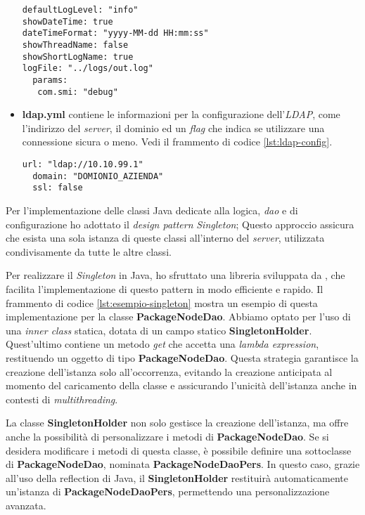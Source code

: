 \begin{itemize}
\begin{lstlisting}[caption={Esempio di configurazione del \textit{logger.yml}.},captionpos=b, label={lst:logger-config}]
defaultLogLevel: "info"
showDateTime: true
dateTimeFormat: "yyyy-MM-dd HH:mm:ss"
showThreadName: false
showShortLogName: true
logFile: "../logs/out.log"
  params:
   com.smi: "debug"
  \end{lstlisting}
 \item \textbf{ldap.yml} contiene le informazioni per la configurazione dell'\textit{LDAP}, come l'indirizzo del \textit{server}, 
 il dominio ed un \textit{flag} che indica se utilizzare una connessione sicura o meno. Vedi il frammento di codice \ref*{lst:ldap-config}.
  \begin{lstlisting}[caption={Esempio di configurazione dell'\textit{ldap.yml}.},captionpos=b, label={lst:ldap-config}]
  url: "ldap://10.10.99.1"
  domain: "DOMIONIO_AZIENDA"
  ssl: false
  \end{lstlisting}
\end{itemize}

Per l'implementazione delle classi Java dedicate alla logica, \textit{dao} e di configurazione ho adottato il 
\textit{design pattern} \textit{Singleton}; 
Questo approccio assicura che esista una sola istanza di queste classi 
all'interno del \textit{server}, utilizzata condivisamente da tutte le altre classi.

Per realizzare il \textit{Singleton} in Java, ho sfruttato una libreria sviluppata da \azienda{}, che facilita 
l'implementazione di questo pattern in modo efficiente e rapido. Il frammento di codice \ref*{lst:esempio-singleton} mostra un esempio 
di questa implementazione per la classe \textbf{PackageNodeDao}. Abbiamo optato per l'uso di una \textit{inner class} statica, 
dotata di un campo statico \textbf{SingletonHolder}. Quest'ultimo contiene un metodo \textit{get} che accetta una \textit{lambda expression}, 
restituendo un oggetto di tipo \textbf{PackageNodeDao}. Questa strategia garantisce la creazione dell'istanza solo all'occorrenza, 
evitando la creazione anticipata al momento del caricamento della classe e assicurando l'unicità dell'istanza anche in contesti di \textit{multithreading}.

La classe \textbf{SingletonHolder} non solo gestisce la creazione dell'istanza, ma offre anche la possibilità di personalizzare i metodi 
di \textbf{PackageNodeDao}. Se si desidera modificare i metodi di questa classe, è possibile definire una sottoclasse di \textbf{PackageNodeDao}, 
nominata \textbf{PackageNodeDaoPers}. In questo caso, grazie all'uso della \gls{reflection} di Java, 
il \textbf{SingletonHolder} restituirà automaticamente un'istanza di \textbf{PackageNodeDaoPers}, permettendo una personalizzazione avanzata.
\newpage


